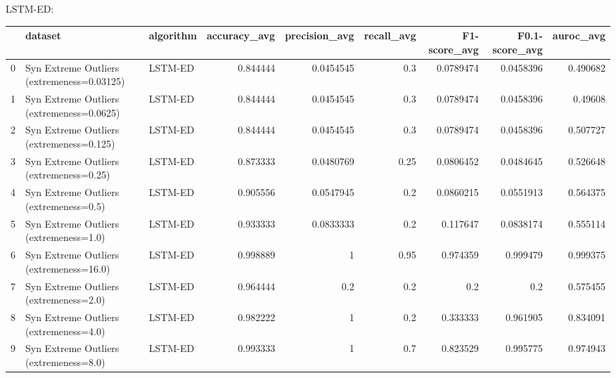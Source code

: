 LSTM-ED:

\begin{tabular}{rllrrrrrr}
\hline
    & dataset                                    & algorithm   &   accuracy\_avg &   precision\_avg &   recall\_avg &   F1-score\_avg &   F0.1-score\_avg &   auroc\_avg \\
\hline
  0 & Syn Extreme Outliers (extremeness=0.03125) & LSTM-ED     &       0.844444 &       0.0454545 &         0.3  &      0.0789474 &        0.0458396 &    0.490682 \\
  1 & Syn Extreme Outliers (extremeness=0.0625)  & LSTM-ED     &       0.844444 &       0.0454545 &         0.3  &      0.0789474 &        0.0458396 &    0.49608  \\
  2 & Syn Extreme Outliers (extremeness=0.125)   & LSTM-ED     &       0.844444 &       0.0454545 &         0.3  &      0.0789474 &        0.0458396 &    0.507727 \\
  3 & Syn Extreme Outliers (extremeness=0.25)    & LSTM-ED     &       0.873333 &       0.0480769 &         0.25 &      0.0806452 &        0.0484645 &    0.526648 \\
  4 & Syn Extreme Outliers (extremeness=0.5)     & LSTM-ED     &       0.905556 &       0.0547945 &         0.2  &      0.0860215 &        0.0551913 &    0.564375 \\
  5 & Syn Extreme Outliers (extremeness=1.0)     & LSTM-ED     &       0.933333 &       0.0833333 &         0.2  &      0.117647  &        0.0838174 &    0.555114 \\
  6 & Syn Extreme Outliers (extremeness=16.0)    & LSTM-ED     &       0.998889 &       1         &         0.95 &      0.974359  &        0.999479  &    0.999375 \\
  7 & Syn Extreme Outliers (extremeness=2.0)     & LSTM-ED     &       0.964444 &       0.2       &         0.2  &      0.2       &        0.2       &    0.575455 \\
  8 & Syn Extreme Outliers (extremeness=4.0)     & LSTM-ED     &       0.982222 &       1         &         0.2  &      0.333333  &        0.961905  &    0.834091 \\
  9 & Syn Extreme Outliers (extremeness=8.0)     & LSTM-ED     &       0.993333 &       1         &         0.7  &      0.823529  &        0.995775  &    0.974943 \\
\hline
\end{tabular}


